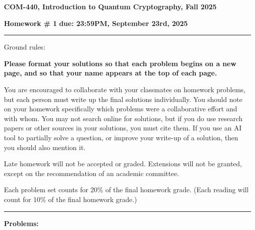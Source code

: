 \documentclass[12pt]{article}
\newcommand{\header}[1]{\begin{center} {\large\bf #1} \end{center}}
\begin{document}
\header{COM-440, Introduction to Quantum Cryptography, Fall 2025}
{\bf Homework \# 1} \hfill {\bf due: 23:59PM, September 23rd, 2025}


\medskip

\hrule

\medskip 

Ground rules: 

{\bf Please
  format your solutions so that each problem begins on a new page, and
  so that your name appears at the top of each page.}

You are encouraged to collaborate with your classmates on
homework problems, but each person must write up the final solutions
individually. You should note on your homework specifically which
problems were a collaborative effort and with whom. You may not search
online for solutions, but if you do use research papers or other
sources in your solutions, you must cite them. If you use an AI tool to 
partially solve a question, or improve your write-up of a solution, then 
you should also mention it. 

Late homework will not be accepted or graded. Extensions will not be granted, except on the recommendation of an academic committee. 

Each problem set counts for 20\% of the final homework grade. (Each reading will count for 10\% of the final homework grade.)

\medskip

\hrule

 
\medskip
{\bf Problems:}
\end{document}
